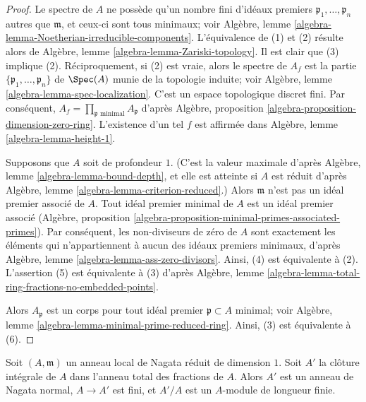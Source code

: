 \begin{proof}
Le spectre de $A$ ne possède qu'un nombre fini d'idéaux premiers
$\mathfrak p_1, \ldots, \mathfrak p_n$ autres que $\mathfrak m$,
et ceux-ci sont tous minimaux; voir
Algèbre, lemme \ref{algebra-lemma-Noetherian-irreducible-components}.
L'équivalence de (1) et (2) résulte alors de
Algèbre, lemme \ref{algebra-lemma-Zariski-topology}.
Il est clair que (3) implique (2). Réciproquement, si (2) est vraie,
alors le spectre de $A_f$ est la partie
$\{\mathfrak p_1, \ldots, \mathfrak p_n\}$ de $\Spec(A)$
munie de la topologie induite; voir
Algèbre, lemme \ref{algebra-lemma-spec-localization}.
C'est un espace topologique discret fini.
Par conséquent, $A_f = \prod_{\mathfrak p\text{ minimal}} A_\mathfrak p$ d'après
Algèbre, proposition \ref{algebra-proposition-dimension-zero-ring}.
L'existence d'un tel $f$ est affirmée dans
Algèbre, lemme \ref{algebra-lemma-height-1}.

\medskip\noindent
Supposons que $A$ soit de profondeur $1$. (C'est la valeur maximale d'après
Algèbre, lemme \ref{algebra-lemma-bound-depth}, et elle est atteinte si $A$ est réduit d'après
Algèbre, lemme \ref{algebra-lemma-criterion-reduced}.)
Alors $\mathfrak m$ n'est pas un idéal premier associé de $A$.
Tout idéal premier minimal de $A$ est un idéal premier associé
(Algèbre, proposition
\ref{algebra-proposition-minimal-primes-associated-primes}).
Par conséquent, les non-diviseurs de zéro de $A$ sont exactement les éléments
qui n'appartiennent à aucun des idéaux premiers minimaux, d'après
Algèbre, lemme \ref{algebra-lemma-ass-zero-divisors}.
Ainsi, (4) est équivalente à (2).
L'assertion (5) est équivalente à (3) d'après
Algèbre, lemme \ref{algebra-lemma-total-ring-fractions-no-embedded-points}.

\medskip\noindent
Alors $A_\mathfrak p$ est un corps pour tout idéal premier
$\mathfrak p \subset A$ minimal; voir
Algèbre, lemme \ref{algebra-lemma-minimal-prime-reduced-ring}.
Ainsi, (3) est équivalente à (6).
\end{proof}

\begin{lemma}
\label{lemma-pre-delta-invariant}
Soit $(A, \mathfrak m)$ un anneau local de Nagata réduit de dimension $1$.
Soit $A'$ la clôture intégrale de $A$ dans l'anneau total des fractions
de $A$. Alors $A'$ est un anneau de Nagata normal, $A \to A'$ est fini, et
$A'/A$ est un $A$-module de longueur finie.
\end{lemma}

